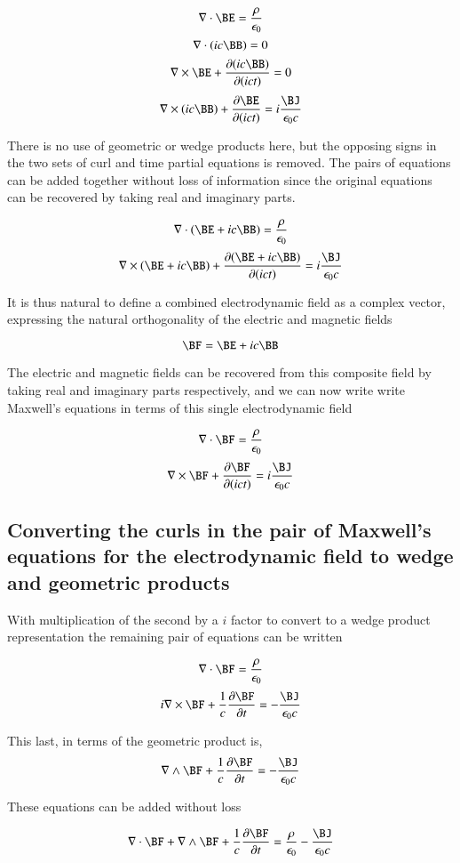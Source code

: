 \[
\nabla \cdot \BE  = \frac {\rho} {\epsilon_0}
\]
\[
\nabla \cdot (ic\BB ) = 0
\]
\[
\nabla \times \BE  +\frac{\partial (ic\BB )} {\partial (ict)} = 0
\]
\[
\nabla \times (ic\BB ) + \frac{\partial \BE } {\partial (ict)}
= i\frac{\BJ}{\epsilon_0 c}
\]

There is no use of geometric or wedge products here, but the opposing signs in the two sets of curl and time partial equations is removed.  The pairs of equations can be added together without loss of information since the original equations can be recovered by taking real and imaginary parts.

\[
\nabla \cdot (\BE + ic \BB) = \frac {\rho} {\epsilon_0}
\]
\[
\nabla \times (\BE + ic \BB) + \frac{\partial (\BE + ic \BB)} {\partial (ict)}
= i\frac{\BJ}{\epsilon_0 c}
\]

It is thus natural to define a combined electrodynamic field as a complex vector, expressing the natural orthogonality of the electric and magnetic fields

\[
\BF = \BE + ic \BB
\]

The electric and magnetic fields can be recovered from this composite field by taking real and imaginary parts respectively, and we can now write write Maxwell's equations in terms of this single electrodynamic field

\[
\nabla \cdot \BF = \frac {\rho} {\epsilon_0}
\]
\[
\nabla \times \BF + \frac{\partial \BF} {\partial (ict)}
= i\frac{\BJ}{\epsilon_0 c}
\]

\subsection{Converting the curls in the pair of Maxwell's equations for the electrodynamic field to wedge and geometric products }

With multiplication of the second by a $i$ factor to convert to a wedge product representation the remaining pair of equations can be written

\[
\nabla \cdot \BF = \frac {\rho} {\epsilon_0}
\]
\[
i\nabla \times \BF + \frac{1}{c} \frac{\partial \BF}{\partial t} 
= -\frac{\BJ}{\epsilon_0 c}  
\]

This last, in terms of the geometric product is,
\[
\nabla \wedge \BF + \frac{1}{c} \frac{\partial \BF}{\partial t} 
= -\frac{\BJ}{\epsilon_0 c}  
\]

These equations can be added without loss

\[
\nabla \cdot \BF + \nabla \wedge \BF + \frac{1}{c} \frac{\partial \BF}{\partial t} = \frac {\rho} {\epsilon_0} - \frac{\BJ}{\epsilon_0 c}
\]


